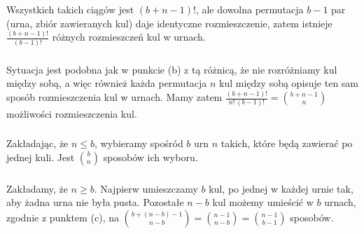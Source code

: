 Wszystkich takich ciągów jest $(b+n-1)!$, ale dowolna permutacja $b-1$ par (urna, zbiór zawieranych kul) daje identyczne rozmieszczenie, zatem istnieje $\frac{(b+n-1)!}{(b-1)!}$ różnych rozmieszczeń kul w urnach.

\subsubsection{} %
Sytuacja jest podobna jak w punkcie (b) z tą różnicą, że nie rozróżniamy kul między sobą, a więc również każda permutacja $n$ kul między sobą opisuje ten sam sposób rozmieszczenia kul w urnach. Mamy zatem $\frac{(b+n-1)!}{n!\,(b-1)!} = \binom{b+n-1}{n}$ możliwości rozmieszczenia kul.

\subsubsection{} %
Zakładając, że $n\le b$, wybieramy spośród $b$ urn $n$ takich, które będą zawierać po jednej kuli. Jest $\binom{b}{n}$ sposobów ich wyboru.

\subsubsection{} %
Zakładamy, że $n\ge b$. Najpierw umieszczamy $b$ kul, po jednej w każdej urnie tak, aby żadna urna nie była pusta. Pozostałe $n-b$ kul możemy umieścić w $b$ urnach, zgodnie z punktem (c), na $\binom{b+(n-b)-1}{n-b}=\binom{n-1}{n-b}=\binom{n-1}{b-1}$ sposobów.
